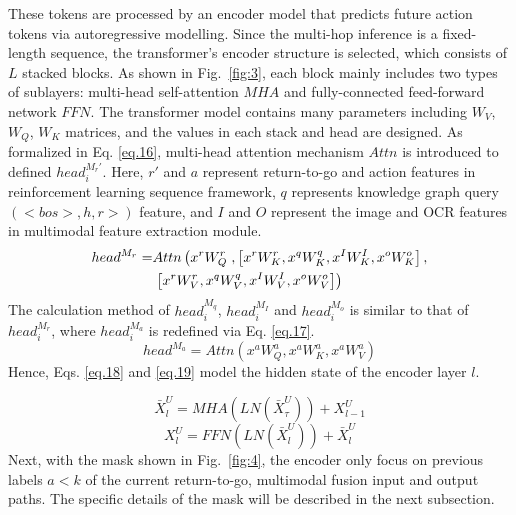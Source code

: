 \documentclass[10pt,journal,compsoc]{IEEEtran}
\begin{document}
These tokens are processed by an encoder model that predicts future action tokens via autoregressive modelling. Since the multi-hop inference is a fixed-length sequence, the transformer's encoder structure is selected, which consists of $L$ stacked blocks. As shown in Fig.~\ref{fig:3}, each block mainly includes two types of sublayers: multi-head self-attention $MHA$ and fully-connected feed-forward network $FFN$. The transformer model contains many parameters including $W_V$, $W_Q$, $W_K$ matrices, and the values in each stack and head are designed. As formalized in Eq. \ref{eq.16}, multi-head attention mechanism $Attn$ is introduced to defined ${head}_i^{M_r'}$. Here, $r'$ and $a$ represent return-to-go and action features in reinforcement learning sequence framework, $q$ represents knowledge graph query $(<bos>,h,r>)$ feature, and $I$ and $O$ represent the image and OCR features in multimodal feature extraction module. 
\begin{equation}\label{eq.16}
\begin{aligned}
 head^{{M_r}} = & Attn\left( {{x^{r}}W_Q^{r}} \right.,\left[ {{x^{r}}W_K^{r},{x^{q}}W_K^{q},{x^{I}}W_K^{I},{x^{o}}W_K^{o}} \right], \hfill \\
  &\left. {\left[ {{x^{r}}W_V^{r},{x^{q}}W_V^{q},{x^{I}}W_V^{I},{x^{o}}W_V^{o}} \right]} \right) \hfill \\ 
\end{aligned}
\end{equation}
The calculation method of  ${head}_i^{M_q}$, ${head}_i^{M_I}$ and ${head}_i^{M_o}$ is similar to that of ${head}_i^{M_r}$, where ${head}_i^{M_a}$ is redefined via Eq. \ref{eq.17}.
\begin{equation}\label{eq.17}
head^{{M_a}} = Attn\left( {{x^{a}}W_Q^{a},{x^{a}}W_K^{a},{x^{a}}W_V^{a}} \right)
\end{equation}
Hence, Eqs. \ref{eq.18} and \ref{eq.19} model the hidden state of the encoder layer $l$.\par
\begin{equation}\label{eq.18}
\bar X_l^U = MHA\left( {LN\left( {\bar X_\tau ^U} \right)} \right) + X_{l - 1}^U
\end{equation}
\begin{equation}\label{eq.19}
X_l^U = FFN\left( {LN\left( {\bar X_l^U} \right)} \right) + \bar X_l^U
\end{equation}
Next, with the mask shown in Fig.~\ref{fig:4}, the encoder only focus on previous labels $a<k$ of the current return-to-go, multimodal fusion input and output paths. The specific details of the mask will be described in the next subsection. \par
\end{document}
